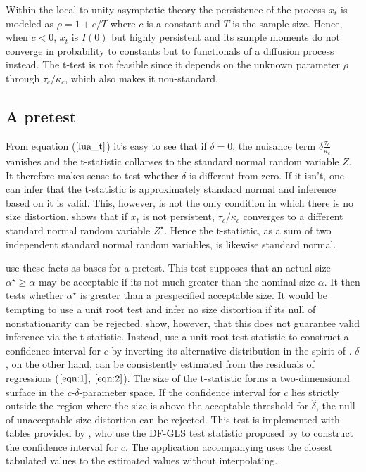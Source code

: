 \documentclass{article}
\begin{document}
Within the local-to-unity asymptotic theory the persistence of the process $x_{t}$ is modeled as $\rho=1+c / T$ where $c$ is a constant and $T$ is the sample size. Hence, when $c<0$, $x_{t}$ is $I(0)$ but highly persistent and its sample moments do not converge in probability to constants but to functionals of a diffusion process instead. The t-test is not feasible since it depends on the unknown parameter $\rho$ through $\tau_{c} / \kappa_{c}$, which also makes it non-standard. 

\subsection{A pretest}
\label{pretest}
From equation ($\ref{lua_t}$) it's easy to see that if $\delta = 0$, the nuisance term $\delta \frac{\tau_{c}}{\kappa_{c}}$ vanishes and the t-statistic collapses to the standard normal random variable $Z$. It therefore makes sense to test whether $\delta$ is different from zero. If it isn't, one can infer that the t-statistic is approximately standard normal and inference based on it is valid. This, however, is not the only condition in which there is no size distortion. \citet{phillips1987towards} shows that if $x_{t}$ is not persistent, $\tau_{c} / \kappa_{c}$ converges to a different standard normal random variable $Z^{\star}$. Hence the t-statistic, as a sum of two independent standard normal random variables, is likewise standard normal. 

\citet{campbell2006efficient} use these facts as bases for a pretest. This test supposes that an actual size $\alpha^{\star}  \geq \alpha$ may be acceptable if its not much greater than the nominal size $\alpha$. It then tests whether $\alpha^{\star}$ is greater than a prespecified acceptable size. It would be tempting to use a unit root test and infer no size distortion if its null of nonstationarity can be rejected. \citet{elliott1994inference} show, however, that this does not guarantee valid inference via the t-statistic. Instead, \citet{campbell2006efficient} use a unit root test statistic to construct a confidence interval for $c$ by inverting its alternative distribution in the spirit of \citet{stock1991confidence}. $\delta$, on the other hand, can be consistently estimated from the residuals of regressions ($\ref{eqn:1}$, $\ref{eqn:2}$). The size of the t-statistic forms a two-dimensional surface in the $c$-$\delta$-parameter space. If the confidence interval for $c$ lies strictly outside the region where the size is above the acceptable threshold for $\hat{\delta}$, the null of unacceptable size distortion can be rejected. This test is implemented with tables provided by \citet{campbell2006efficient}, who use the DF-GLS test statistic proposed by \citet{elliott1996efficient} to construct the confidence interval for $c$. The application accompanying uses the closest tabulated values to the estimated values without interpolating.
\end{document}
